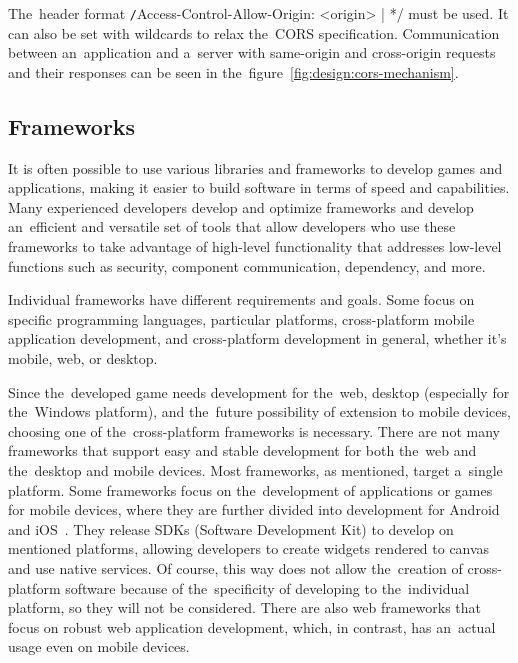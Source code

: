 The~header format \texttt/Access-Control-Allow-Origin: <origin> | */ must be used.
It can also be set with wildcards to relax the~CORS specification.
Communication between an~application and a~server with same-origin and cross-origin requests and their responses can be seen in the~figure~\ref{fig:design:cors-mechanism}.

\subsection{Frameworks}

It is often possible to use various libraries and frameworks to develop games and applications, making it easier to build software in terms of speed and capabilities.
Many experienced developers develop and optimize frameworks and develop an~efficient and versatile set of tools that allow developers who use these frameworks to take advantage of high-level functionality that addresses low-level functions such as security, component communication, dependency, and more.

Individual frameworks have different requirements and goals.
Some focus on specific programming languages, particular platforms, cross-platform mobile application development, and cross-platform development in general, whether it's mobile, web, or desktop.

Since the~developed game needs development for the~web, desktop (especially for the~Windows platform), and the~future possibility of extension to mobile devices, choosing one of the~cross-platform frameworks is necessary.
There are not many frameworks that support easy and stable development for both the~web and the~desktop and mobile devices.
Most frameworks, as mentioned, target a~single platform.
Some frameworks focus on the~development of applications or games for mobile devices, where they are further divided into development for Android and iOS~\cite{leler_2017_whats}.
They release SDKs (Software Development Kit) to develop on mentioned platforms, allowing developers to create widgets rendered to canvas and use native services.
Of course, this way does not allow the~creation of cross-platform software because of the~specificity of developing to the~individual platform, so they will not be considered.
There are also web frameworks that focus on robust web application development, which, in contrast, has an~actual usage even on mobile devices.

